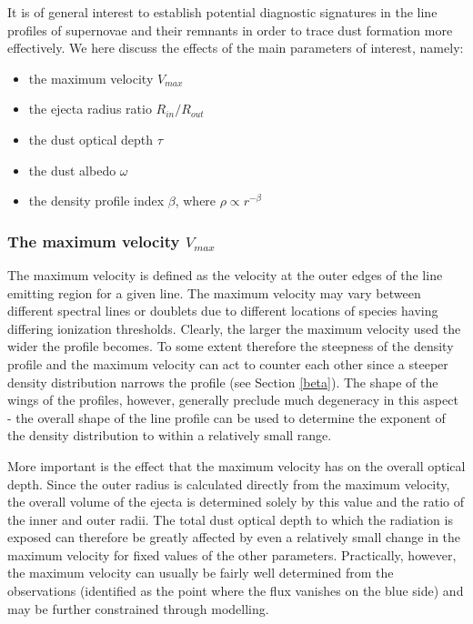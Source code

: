 \documentclass[useAMS,usenatbib,usegraphicx]{mnras}
\begin{document}
It is of general interest to establish potential diagnostic signatures in 
the line profiles of supernovae and their remnants in order to trace dust 
formation more effectively.  We here discuss the effects of the main 
parameters of interest, namely:

\begin{itemize}
\item the maximum velocity $V_{max}$
\item the ejecta radius ratio  $R_{in}/R_{out}$
\item the dust optical depth $\tau$
\item the dust albedo $\omega$ 
\item the density profile index $\beta$, where $\rho \propto r^{-\beta}$
\end{itemize}


\subsubsection{The maximum velocity $V_{max}$}

The maximum velocity is defined as the velocity at the outer edges of 
the line emitting region for a given line.  The 
maximum velocity may vary between different spectral lines or doublets due 
to different locations of  species having differing ionization 
thresholds.  Clearly, the larger the maximum velocity used the wider the 
profile becomes.  To some extent therefore the steepness of the density 
profile and the maximum velocity can act to counter each other since a steeper 
density distribution narrows the profile (see Section \ref{beta}).  The shape 
of the wings of the profiles, however, generally preclude much degeneracy 
in this aspect - the overall shape of the line profile can be used to determine the 
exponent of the density distribution to within a relatively small range.

More important is the effect that the maximum velocity has on the overall 
optical depth.  Since the outer radius is calculated directly from the maximum velocity, the overall volume of the ejecta is determined 
solely by  this value and the ratio of the inner and outer radii.  
The total dust optical depth to which the radiation is exposed can therefore be greatly affected by even a relatively small change in the maximum velocity for fixed values of the other parameters.  
Practically, however, the maximum velocity can usually be fairly well determined 
from the observations (identified as the point where the flux vanishes 
on the blue side) and may be further constrained through modelling.
\end{document}
